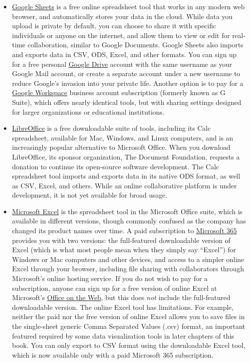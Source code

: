 \documentclass[
  english,
]{book}
\providecommand{\tightlist}{%
  \setlength{\itemsep}{0pt}\setlength{\parskip}{0pt}}
\begin{document}
\begin{itemize}
\tightlist
\item
  \href{https://www.google.com/sheets/about/}{Google Sheets} is a free online spreadsheet tool that works in any modern web browser, and automatically stores your data in the cloud. While data you upload is private by default, you can choose to share it with specific individuals or anyone on the internet, and allow them to view or edit for real-time collaboration, similar to Google Documents. Google Sheets also imports and exports data in CSV, ODS, Excel, and other formats. You can sign up for a free personal \href{https://drive.google.com}{Google Drive} account with the same username as your Google Mail account, or create a separate account under a new username to reduce Google's invasion into your private life. Another option is to pay for a \href{https://workspace.google.com/}{Google Workspace} business account subscription (formerly known as G Suite), which offers nearly identical tools, but with sharing settings designed for larger organizations or educational institutions.
\item
  \href{https://www.libreoffice.org/}{LibreOffice} is a free downloadable suite of tools, including its Calc spreadsheet, available for Mac, Windows, and Linux computers, and is an increasingly popular alternative to Microsoft Office. When you download LibreOffice, its sponsor organization, The Document Foundation, requests a donation to continue its open-source software development. The Calc spreadsheet tool imports and exports data in its native ODS format, as well as CSV, Excel, and others. While an online collaborative platform is under development, it is not yet available for broad usage.
\item
  \href{https://support.microsoft.com/en-us/excel}{Microsoft Excel} is the spreadsheet tool in the Microsoft Office suite, which is available in different versions, though commonly confused as the company has changed its product names over time. A paid subscription to \href{https://www.microsoft.com/en-us/microsoft-365}{Microsoft 365} provides you with two versions: the full-featured downloadable version of Excel (which is what most people mean when they simply say ``Excel'') for Windows or Mac computers and other devices, and access to a simpler online Excel through your browser, including file sharing with collaborators through Microsoft's online hosting service. If you do not wish to pay for a subscription, anyone can sign up for a free version of online Excel at Microsoft's \href{https://office.com}{Office on the Web}, but this does \emph{not} include the full-featured downloadable version. The online Excel tool has limitations. For example, neither the paid nor the free version of online Excel allows you to save files in the single-sheet generic Comma Separated Values (.csv) format, an important featured required by some data visualization tools in later chapters of this book. You can only export to CSV format using the downloadable Excel tool, which is now available only with a paid Microsoft 365 subscription.
\end{itemize}
\end{document}
